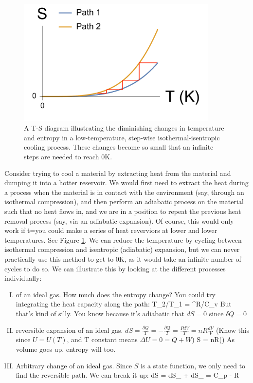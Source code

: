 \documentclass[12pt]{article}
\begin{document}
\begin{figure}[h]
\label{Can_We_Reach_0_K}
\centering
\includegraphics[width = 10cm]{Can_We_achieve_0K.pdf}
\caption{A T-S diagram illustrating the diminishing changes in temperature and entropy in a low-temperature, step-wise isothermal-isentropic cooling process. These changes become so small that an infinite steps are needed to reach 0K.}
\end{figure}

Consider trying to cool a material by extracting heat from the material and dumping it into a hotter reservoir. %
We would first need to extract the heat during a process when the material is in contact with the environment (say, through an isothermal compression), and then perform an adiabatic process on the material such that no heat flows in, and we are in a position to repeat the previous heat removal process (say, via an adiabatic expansion).  Of course, this would only work if t=you could make a series of heat reverviors at lower and lower temperatures. See Figure \ref{Can_We_Reach_0_K}.  We can reduce the temperature by cycling between isothermal compression and isentropic (adiabatic) expansion, but we can never practically use this method to get to 0K, as it would take an infinite number of cycles to do so. We can illustrate this by looking at the different processes individually:
\begin{enumerate}[(I)]
\item {} of an ideal gas.  How much does the entropy change? You could try integrating the heat capacity along the path:
\beq T_2/T_1 = ^{R/C_v} \ceq
But that's kind of silly. You know because it's adiabatic that $d S = 0$ since $\delta Q = 0$
\item {} reversible expansion of an ideal gas.  $dS = \frac{\partial Q}{T} = -\frac{\partial Q}{T} = \frac{PdV}{T} = nR \frac{dV}{V}$ (Know this since $U=U(T)$, and T constant means $\Delta U = 0 = Q + W$)
\beq \Delta S = nR\ln() \ceq
As volume goes up, entropy will too.
\item Arbitrary change of an ideal gas.  Since $S$ is a state function, we only need to find the reversible path.  We can break it up:
\beq dS = dS_ + dS_ = C_p  - R \ceq

\end{enumerate}
\end{document}
